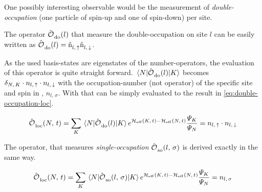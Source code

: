 
One possibly interesting observable would be the measurement of \emph{double-occupation} (one particle of spin-up and one of spin-down) per site.

The operator ${\hat{\text{$\mathcal{O}$}}^{ }_{}}_\text{do}(l)$ that measure the double-occupation on site $l$ can be easily written as ${\hat{\text{$\mathcal{O}$}}^{ }_{}}_\text{do}(l) = \hat{\text{n}}^{ }_{l,\,\uparrow}\hat{\text{n}}^{ }_{l,\,\downarrow}$.

As the used basis-states are eigenstates of the number-operators, the evaluation of this operator is quite straight forward. 
$\bracketHelper{N}{\doubleOccupationOperator{l}}{K}$ becomes $\delta_{N,\,K}\cdot n_{l,\,\uparrow}\cdot n_{l,\,\downarrow}$ with the occupation-number (not operator) of the specific site and spin in \braN, $n_{l,\,\sigma}$. 
With that  can be simply evaluated to the result in \autoref{eq:double-occupation-loc}.

\begin{equation}
    \label{eq:double-occupation-loc}
    \localObservable{N}{t} = \lsum[K] \bracketHelper{N}{\doubleOccupationOperator{l}}{K} e^{\HeffOft[K]-\HeffOft[N]}
    \frac{
        \psiN[K]
    }{
        \psiN[N]
    } = n_{l,\,\up}\cdot n_{l,\,\down}
\end{equation}

The operator, that measures \emph{single-occupation} ${\hat{\text{$\mathcal{O}$}}^{ }_{}}_\text{so}(l,\,\sigma)$ is derived exactly in the same way.

\begin{equation}
    \label{eq:single-occupation-loc}
    \localObservable{N}{t} = \lsum[K] \bracketHelper{N}{\singleOccupationOperator{l}{\sigma}}{K} e^{\HeffOft[K]-\HeffOft[N]}
    \frac{
        \psiN[K]
    }{
        \psiN[N]
    } = n_{l,\,\sigma}
\end{equation}